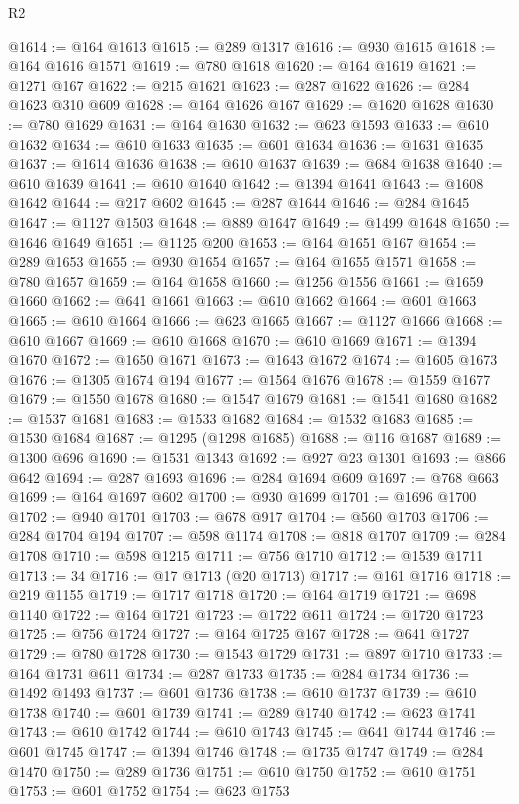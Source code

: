 \begin{lexlean}{R2}
\begin{coremodule}
@1614 := @164 @1613
@1615 := @289 @1317
@1616 := @930 @1615
@1618 := @164 @1616 @1571
@1619 := @780 @1618
@1620 := @164 @1619
@1621 := @1271 @167
@1622 := @215 @1621
@1623 := @287 @1622
@1626 := @284 @1623 @310 @609
@1628 := @164 @1626 @167
@1629 := @1620 @1628
@1630 := @780 @1629
@1631 := @164 @1630
@1632 := @623 @1593
@1633 := @610 @1632
@1634 := @610 @1633
@1635 := @601 @1634
@1636 := @1631 @1635
@1637 := @1614 @1636
@1638 := @610 @1637
@1639 := @684 @1638
@1640 := @610 @1639
@1641 := @610 @1640
@1642 := @1394 @1641
@1643 := @1608 @1642
@1644 := @217 @602
@1645 := @287 @1644
@1646 := @284 @1645
@1647 := @1127 @1503
@1648 := @889 @1647
@1649 := @1499 @1648
@1650 := @1646 @1649
@1651 := @1125 @200
@1653 := @164 @1651 @167
@1654 := @289 @1653
@1655 := @930 @1654
@1657 := @164 @1655 @1571
@1658 := @780 @1657
@1659 := @164 @1658
@1660 := @1256 @1556
@1661 := @1659 @1660
@1662 := @641 @1661
@1663 := @610 @1662
@1664 := @601 @1663
@1665 := @610 @1664
@1666 := @623 @1665
@1667 := @1127 @1666
@1668 := @610 @1667
@1669 := @610 @1668
@1670 := @610 @1669
@1671 := @1394 @1670
@1672 := @1650 @1671
@1673 := @1643 @1672
@1674 := @1605 @1673
@1676 := @1305 @1674 @194
@1677 := @1564 @1676
@1678 := @1559 @1677
@1679 := @1550 @1678
@1680 := @1547 @1679
@1681 := @1541 @1680
@1682 := @1537 @1681
@1683 := @1533 @1682
@1684 := @1532 @1683
@1685 := @1530 @1684
@1687 := @1295 (@1298 @1685)
@1688 := @116 @1687
@1689 := @1300 @696
@1690 := @1531 @1343
@1692 := @927 @23 @1301
@1693 := @866 @642
@1694 := @287 @1693
@1696 := @284 @1694 @609
@1697 := @768 @663
@1699 := @164 @1697 @602
@1700 := @930 @1699
@1701 := @1696 @1700
@1702 := @940 @1701
@1703 := @678 @917
@1704 := @560 @1703
@1706 := @284 @1704 @194
@1707 := @598 @1174
@1708 := @818 @1707
@1709 := @284 @1708
@1710 := @598 @1215
@1711 := @756 @1710
@1712 := @1539 @1711
@1713 := 34
@1716 := @17 @1713 (@20 @1713)
@1717 := @161 @1716
@1718 := @219 @1155
@1719 := @1717 @1718
@1720 := @164 @1719
@1721 := @698 @1140
@1722 := @164 @1721
@1723 := @1722 @611
@1724 := @1720 @1723
@1725 := @756 @1724
@1727 := @164 @1725 @167
@1728 := @641 @1727
@1729 := @780 @1728
@1730 := @1543 @1729
@1731 := @897 @1710
@1733 := @164 @1731 @611
@1734 := @287 @1733
@1735 := @284 @1734
@1736 := @1492 @1493
@1737 := @601 @1736
@1738 := @610 @1737
@1739 := @610 @1738
@1740 := @601 @1739
@1741 := @289 @1740
@1742 := @623 @1741
@1743 := @610 @1742
@1744 := @610 @1743
@1745 := @641 @1744
@1746 := @601 @1745
@1747 := @1394 @1746
@1748 := @1735 @1747
@1749 := @284 @1470
@1750 := @289 @1736
@1751 := @610 @1750
@1752 := @610 @1751
@1753 := @601 @1752
@1754 := @623 @1753

\end{coremodule}
\end{lexlean}
